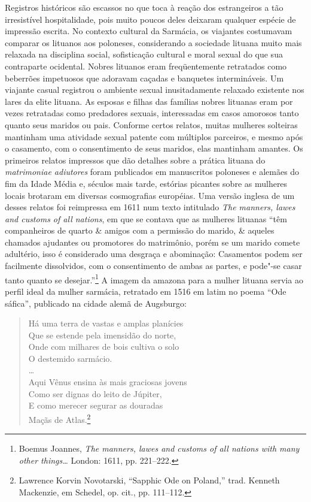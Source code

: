 Registros históricos são escassos no que toca à reação dos estrangeiros
a tão irresistível hospitalidade, pois muito poucos deles deixaram
qualquer espécie de impressão escrita. No contexto cultural da Sarmácia,
os viajantes costumavam comparar os lituanos aos poloneses, considerando
a sociedade lituana muito mais relaxada na disciplina social,
sofisticação cultural e moral sexual do que sua contraparte ocidental.
Nobres lituanos eram freqüentemente retratados como beberrões impetuosos
que adoravam caçadas e banquetes intermináveis. Um viajante casual
registrou o ambiente sexual inusitadamente relaxado existente nos lares
da elite lituana. As esposas e filhas das famílias nobres lituanas eram
por vezes retratadas como predadores sexuais, interessadas em casos
amorosos tanto quanto seus maridos ou pais. Conforme certos relatos,
muitas mulheres solteiras mantinham uma atividade sexual patente com
múltiplos parceiros, e mesmo após o casamento, com o consentimento de
seus maridos, elas mantinham amantes. Os primeiros relatos impressos que
dão detalhes sobre a prática lituana do \emph{matrimoniae adiutores}
foram publicados em manuscritos poloneses e alemães do fim da Idade
Média e, séculos mais tarde, estórias picantes sobre as mulheres locais
brotaram em diversas cosmografias européias. Uma versão inglesa de um
desses relatos foi reimpressa em 1611 num texto intitulado \emph{The
manners, lawes and customs of all nations}, em que se contava que as
mulheres lituanas ``têm companheiros de quarto \& amigos com a permissão
do marido, \& aqueles chamados ajudantes ou promotores do matrimônio,
porém se um marido comete adultério, isso é considerado uma desgraça e
abominação: Casamentos podem ser facilmente dissolvidos, com o
consentimento de ambas as partes, e pode"-se casar tanto quanto se
desejar.''\footnote{Boemus Joannes, \emph{The manners, lawes and customs
  of all nations with many other things\ldots{}} London: 1611, pp.
  221--222.} A imagem da amazona para a mulher lituana servia ao perfil
ideal da mulher sarmácia, retratado em 1516 em latim no poema ``Ode
sáfica'', publicado na cidade alemã de Augsburgo:

\begin{verse}
Há uma terra de vastas e amplas planícies\\
Que se estende pela imensidão do norte,\\
Onde com milhares de bois cultiva o solo\\
O destemido sarmácio.\\
\ldots{}\\

Aqui Vênus ensina às mais graciosas jovens\\
Como ser dignas do leito de Júpiter,\\
E como merecer segurar as douradas\\
Maçãs de Atlas.\footnote{Lawrence Korvin Novotarski, ``Sapphic Ode on
  Poland,'' trad. Kenneth Mackenzie, em Schedel, op. cit., pp. 111--112.}
\end{verse}

